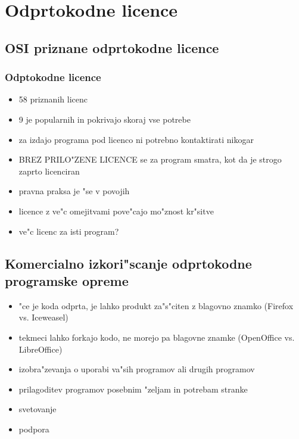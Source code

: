 \documentclass{beamer}
\begin{document}
\section{Odprtokodne licence}
\subsection{OSI priznane odprtokodne licence}

\begin{frame}
\frametitle{Odptokodne licence}
\begin{itemize}
\item 58 priznanih licenc
\item 9 je popularnih in pokrivajo skoraj vse potrebe
\item za izdajo programa pod licenco ni potrebno kontaktirati nikogar
\item BREZ PRILO"ZENE LICENCE se za program smatra, kot da je strogo zaprto licenciran
\item pravna praksa je "se v povojih
\item licence z ve"c omejitvami pove"cajo mo"znost kr"sitve
\item ve"c licenc za isti program?
\end{itemize}
\end{frame}

\subsection{Komercialno izkori"scanje odprtokodne programske opreme}

\begin{frame}
\begin{itemize}
\frametitle{Kako poslovno izkori"s"cati odprto kodo?}
\item "ce je koda odprta, je lahko produkt za"s"citen z blagovno znamko (Firefox vs. Iceweasel)
\item tekmeci lahko forkajo kodo, ne morejo pa blagovne znamke (OpenOffice vs. LibreOffice)
\item izobra"zevanja o uporabi va"sih programov ali drugih programov
\item prilagoditev programov posebnim "zeljam in potrebam stranke
\item svetovanje
\item podpora
\end{itemize}
\end{frame}
\end{document}
